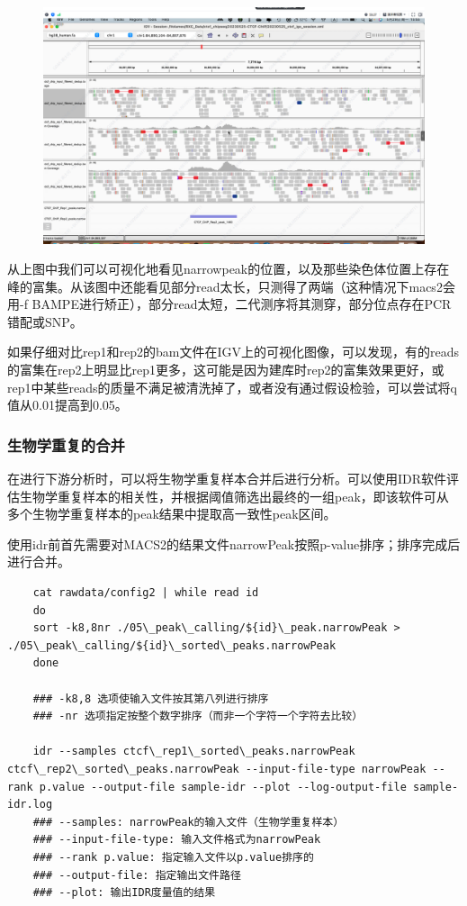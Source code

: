\begin{figure}[ht]
    \centering
    \includegraphics[width=13cm]{figure/igv.png}
\end{figure}

从上图中我们可以可视化地看见narrowpeak的位置，以及那些染色体位置上存在峰的富集。从该图中还能看见部分read太长，只测得了两端（这种情况下macs2会用-f BAMPE进行矫正），部分read太短，二代测序将其测穿，部分位点存在PCR错配或SNP。\par
如果仔细对比rep1和rep2的bam文件在IGV上的可视化图像，可以发现，有的reads的富集在rep2上明显比rep1更多，这可能是因为建库时rep2的富集效果更好，或rep1中某些reads的质量不满足被清洗掉了，或者没有通过假设检验，可以尝试将q值从0.01提高到0.05。\par


\subsubsection{生物学重复的合并}
在进行下游分析时，可以将生物学重复样本合并后进行分析。可以使用IDR软件评估生物学重复样本的相关性，并根据阈值筛选出最终的一组peak，即该软件可从多个生物学重复样本的peak结果中提取高一致性peak区间。\par
使用idr前首先需要对MACS2的结果文件narrowPeak按照p-value排序；排序完成后进行合并。

\begin{lstlisting}
    cat rawdata/config2 | while read id
    do
    sort -k8,8nr ./05\_peak\_calling/${id}\_peak.narrowPeak > ./05\_peak\_calling/${id}\_sorted\_peaks.narrowPeak 
    done

    ### -k8,8 选项使输入文件按其第八列进行排序
    ### -nr 选项指定按整个数字排序（而非一个字符一个字符去比较）

    idr --samples ctcf\_rep1\_sorted\_peaks.narrowPeak ctcf\_rep2\_sorted\_peaks.narrowPeak --input-file-type narrowPeak --rank p.value --output-file sample-idr --plot --log-output-file sample-idr.log
    ### --samples: narrowPeak的输入文件（生物学重复样本）
    ### --input-file-type: 输入文件格式为narrowPeak
    ### --rank p.value: 指定输入文件以p.value排序的
    ### --output-file: 指定输出文件路径
    ### --plot: 输出IDR度量值的结果
\end{lstlisting}

